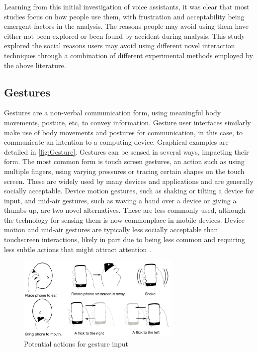 \documentclass{l4proj}
\begin{document}
Learning from this initial investigation of voice assistants, it was clear that most studies focus on how people use them, with frustration and acceptability being emergent factors in the analysis. The reasons people may avoid using them have either not been explored or been found by accident during analysis. This study explored the social reasons users may avoid using different novel interaction techniques through a combination of different experimental methods employed by the above literature.

\subsection{Gestures}

Gestures are a non-verbal communication form, using meaningful body movements, posture, etc, to convey information. Gesture user interfaces similarly make use of body movements and postures for communication, in this case, to communicate an intention to a computing device. Graphical examples are detailed in \autoref{fig:Gesture}. Gestures can be sensed in several ways, impacting their form. The most common form is touch screen gestures, an action such as using multiple fingers, using varying pressures or tracing certain shapes on the touch screen. These are widely used by many devices and applications and are generally socially acceptable. Device motion gestures, such as shaking or tilting a device for input, and mid-air gestures, such as waving a hand over a device or giving a thumbs-up, are two novel alternatives. These are less commonly used, although the technology for sensing them is now commonplace in mobile devices. Device motion and mid-air gestures are typically less socially acceptable than touchscreen interactions, likely in part due to being less common and requiring less subtle actions that might attract attention \citep{rico_usable_2010}.

\begin{figure}[h!]
    \centering
    \includegraphics[width=0.7\textwidth]{images/gestures.png}
        \caption{Potential actions for gesture input}
        \label{fig:Gesture}
\end{figure}
\end{document}
